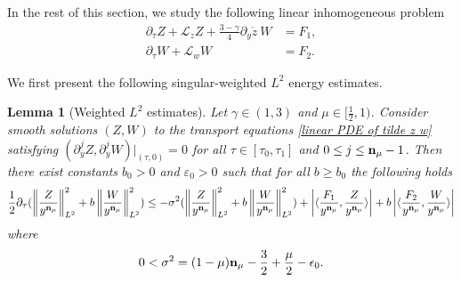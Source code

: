 \documentclass{article}
\newcommand{\norm}[1]{\left\lVert#1\right\rVert}
\newcommand{\ga}{\gamma}
\newcommand{\pa}{\partial}
\newcommand\eps{\varepsilon}
\def\be{\begin{equation}}
\def\ee{\end{equation}}
\def\beqa{\begin{equation}\begin{aligned}}
\def\eeqa{\end{aligned}\end{equation}}
\def\espz{Z}
\def\espw{W}
\def\lz{\mathcal L_z}
\def\lw{\mathcal L_w}
\def\ndmu{{\bf{n}_{\mu}}}
\numberwithin{equation}{section}
\newtheorem{lemma}[theorem]{Lemma}
\begin{document}
In the rest of this section, we study the following linear inhomogeneous problem 
\be\label{linear PDE of tilde z w}
	\begin{aligned}
	\partial_\tau \espz +\lz \espz +\frac{3-\ga}{4}\partial_y \mathring z \ \espw 
    &= F_1,\\
		\partial_\tau \espw +\lw \espw &= F_2.
	\end{aligned}
\ee





We first present the following singular-weighted $L^2$ energy estimates.  

\begin{lemma}[Weighted $L^2$ estimates]\label{weighted L^2 estimates}
	Let $\ga\in(1,3)$ and $\mu\in[\frac12,1)$. Consider smooth solutions $(Z,W)$ to the transport equations \eqref{linear PDE of tilde z w} satisfying $(\pa_y^j Z,\pa_y^jW)|_{(\tau,0)} =0$ for all $\tau\in [\tau_0,\tau_1]$ and $0\le j\le \ndmu-1$. 
	Then there exist constants $b_0 >0$ and $\eps_0>0$  such that for all $b\ge b_0$ the following holds
	\beqa
		\frac12\pa_\tau(\norm{\frac{\espz}{y^{\ndmu}}}_{L^2}^2 + b \norm{\frac{\espw}{y^{\ndmu}}}_{L^2}^2) \leq -\sigma^2 (\norm{\frac{\espz}{y^{\ndmu}}}_{L^2}^2 +b  \norm{\frac{\espw}{y^{\ndmu}}}_{L^2}^2) + \left| \langle \frac{F_1}{y^{\ndmu}},\frac{\espz}{y^{\ndmu}} \rangle\right|  + b \left| \langle \frac{F_2}{y^{\ndmu}},\frac{\espw}{y^{\ndmu}} \rangle\right|  
	\eeqa
	where 
	\[
		0< \sigma^2 = (1-\mu)\ndmu-\frac32+\frac{\mu}{2}- \epsilon_0.
	\] 
\end{lemma}
\end{document}
